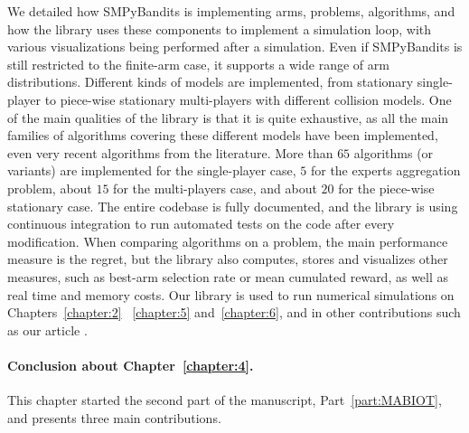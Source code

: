 We detailed how SMPyBandits is implementing arms, problems, algorithms, and how the library uses these components to implement a simulation loop, with various visualizations being performed after a simulation.
Even if SMPyBandits is still restricted to the finite-arm case, it supports a wide range of arm distributions.
Different kinds of models are implemented, from stationary single-player to piece-wise stationary multi-players with different collision models.
One of the main qualities of the library is that it is quite exhaustive, as all the main families of algorithms covering these different models have been implemented, even very recent algorithms from the literature.
More than $65$ algorithms (or variants) are implemented for the single-player case, $5$ for the experts aggregation problem, about $15$ for the multi-players case, and about $20$ for the piece-wise stationary case.
The entire codebase is fully documented, and the library is using continuous integration to run automated tests on the code after every modification.
%
When comparing algorithms on a problem, the main performance measure is the regret, but the library also computes, stores and visualizes other measures, such as best-arm selection rate or mean cumulated reward, as well as real time and memory costs.
%
Our library is used to run numerical simulations on Chapters~\ref{chapter:2}~ \ref{chapter:5} and~\ref{chapter:6}, and in other contributions such as our article \cite{Besson2018DoublingTricks}.


\paragraph{Conclusion about \textbf{Chapter~\ref{chapter:4}}.}

This chapter started the second part of the manuscript, Part~\ref{part:MABIOT}, and presents three main contributions.

